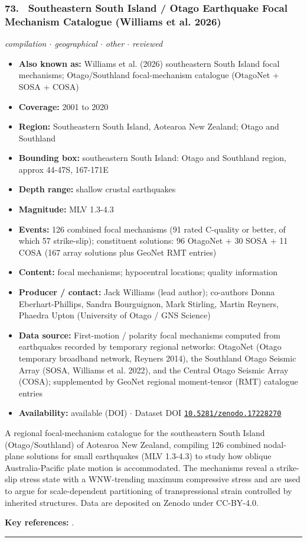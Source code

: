 \documentclass[10pt,a4paper]{article}
\newcommand{\catentryrule}{\par\vspace{3pt}\noindent\textcolor{rulegrey}{\rule{\linewidth}{0.3pt}}\par\vspace{5pt}}
\newcommand{\kv}[2]{\item \textbf{#1:} #2}
\begin{document}
\subsubsection*{\hypertarget{c:73}{73.}~ Southeastern South Island / Otago Earthquake Focal Mechanism Catalogue (Williams et al. 2026)}
{\small\itshape compilation $\cdot$ geographical $\cdot$ other $\cdot$ reviewed}\par\vspace{2pt}
\begin{itemize}[leftmargin=1.3em,itemsep=0.6pt,topsep=1pt,parsep=0pt]
\kv{Also known as}{Williams et al. (2026) southeastern South Island focal mechanisms; Otago/Southland focal-mechanism catalogue (OtagoNet + SOSA + COSA)}
\kv{Coverage}{2001 to 2020}
\kv{Region}{Southeastern South Island, Aotearoa New Zealand; Otago and Southland}
\kv{Bounding box}{southeastern South Island: Otago and Southland region, approx 44-47S, 167-171E}
\kv{Depth range}{shallow crustal earthquakes}
\kv{Magnitude}{MLV 1.3-4.3}
\kv{Events}{126 combined focal mechanisms (91 rated C-quality or better, of which 57 strike-slip); constituent solutions: 96 OtagoNet + 30 SOSA + 11 COSA (167 array solutions plus GeoNet RMT entries)}
\kv{Content}{focal mechanisms; hypocentral locations; quality information}
\kv{Producer / contact}{Jack Williams (lead author); co-authors Donna Eberhart-Phillips, Sandra Bourguignon, Mark Stirling, Martin Reyners, Phaedra Upton (University of Otago / GNS Science)}
\kv{Data source}{First-motion / polarity focal mechanisms computed from earthquakes recorded by temporary regional networks: OtagoNet (Otago temporary broadband network, Reyners 2014), the Southland Otago Seismic Array (SOSA, Williams et al. 2022), and the Central Otago Seismic Array (COSA); supplemented by GeoNet regional moment-tensor (RMT) catalogue entries}
\kv{Availability}{available (DOI) $\cdot$ Dataset DOI \href{https://doi.org/10.5281/zenodo.17228270}{\nolinkurl{10.5281/zenodo.17228270}}}
\end{itemize}
\par\vspace{2pt}A regional focal-mechanism catalogue for the southeastern South Island (Otago/Southland) of Aotearoa New Zealand, compiling 126 combined nodal-plane solutions for small earthquakes (MLV 1.3-4.3) to study how oblique Australia-Pacific plate motion is accommodated. The mechanisms reveal a strike-slip stress state with a WNW-trending maximum compressive stress and are used to argue for scale-dependent partitioning of transpressional strain controlled by inherited structures. Data are deposited on Zenodo under CC-BY-4.0.
\par\vspace{2pt}\textbf{Key references:} \cite{Williams2026a,Williams2025a}.
\catentryrule
\end{document}
